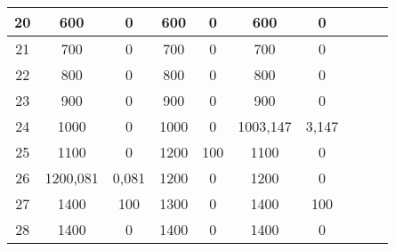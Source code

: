\documentclass[a4paper,12pt]{article}
\theoremstyle{definition}
\begin{document}
\begin{table}[H]
\begin{tabular}{|c|c|c|c|c|c|c|c|c|c|}
    20    & 600   & 0     & 600   & 0     & 600   & 0 \\\hline
    21    & 700   & 0     & 700   & 0     & 700   & 0 \\\hline
    22    & 800   & 0     & 800   & 0     & 800   & 0 \\\hline
    23    & 900   & 0     & 900   & 0     & 900   & 0 \\\hline
    24    & 1000  & 0     & 1000  & 0     & 1003,147 & 3,147 \\\hline
    25    & 1100  & 0     & 1200  & 100   & 1100  & 0 \\\hline
    26    & 1200,081 & 0,081 & 1200  & 0     & 1200  & 0 \\\hline
    27    & 1400  & 100   & 1300  & 0     & 1400  & 100 \\\hline
    28    & 1400  & 0     & 1400  & 0     & 1400  & 0 \\\hline
\end{tabular}	
\end{table}
\end{document}

